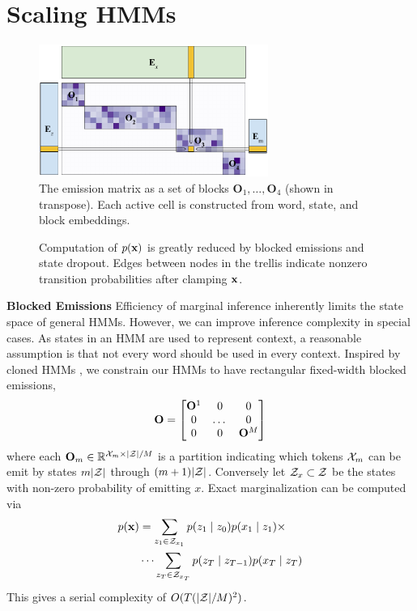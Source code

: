 \documentclass[11pt,a4paper]{article}
\begin{document}
\section{Scaling HMMs}
\label{sec:methods}

\begin{figure}[t]
\centering
\includegraphics[height=1.7in]{img/mat.pdf}
\caption{\label{fig:emit}
The emission matrix as a set of blocks $\mathbf{O}_1, \ldots, \mathbf{O}_4$ (shown in transpose). Each active cell is constructed from word, state, and block embeddings. 
}
\end{figure}

\begin{figure}[!t]
\begin{center}

\end{center}
\caption{
\label{fig:trellis}
Computation of $p(\mathbf{x})$ is greatly reduced by blocked emissions
and state dropout. Edges between nodes in the trellis indicate
nonzero transition probabilities after clamping $\mathbf{x}$.
}
\end{figure}

\noindent
\textbf{Blocked Emissions} Efficiency of marginal inference inherently limits 
the state space of general HMMs.
However, we can improve inference complexity in special cases.
As states in an HMM are used to represent context, a reasonable assumption
is that not every word should be used in every context.
Inspired by cloned HMMs \citep{dedieu2019learning},
we constrain our HMMs to have rectangular fixed-width blocked emissions,
\[\mathbf{O} = \begin{bmatrix} \mathbf{O}^1 & 0 & 0 \\ 0 & $\dots$ & 0 \\ 0 & 0 & \mathbf{O}^M \\
\end{bmatrix}\]
where each $\mathbf{O}_m \in \mathbb{R}^{ {\cal X}_m \times |{\cal Z}|/M}$
is a partition indicating which tokens ${\cal X}_m$ can be emit by states
$m|{\cal Z}|$ through $(m+1)|{\cal Z}|$.
Conversely let $\mathcal{Z}_x \subset {\cal Z}$ be the states with non-zero probability of emitting $x$.
Exact marginalization can be computed via 
\begin{equation}
\label{eqn:sparse_marginalization}
\begin{aligned}
p(\mathbf{x}) &= \sum_{z_1 \in \mathcal{Z}_{x_1}} p(z_1\mid z_0)p(x_1 \mid z_1) \times\\
    &\cdots
    \sum_{z_T \in \mathcal{Z}_{x_T}} p(z_T \mid z_{T-1})p(x_T \mid z_T)
\end{aligned}
\end{equation}
This gives a serial complexity of $O(T(|\mathcal{Z}|/M)^2)$.
\end{document}
